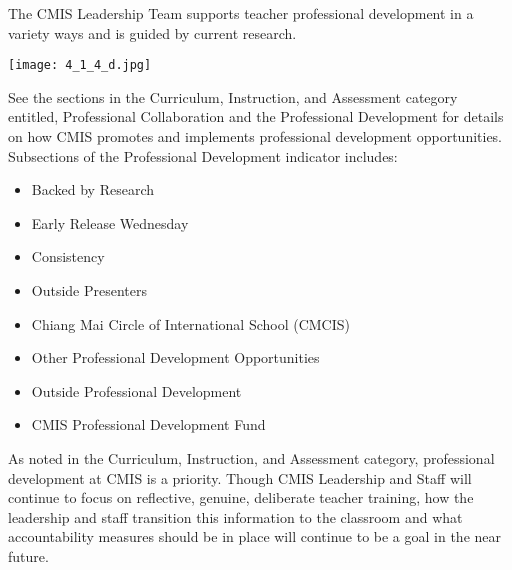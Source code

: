 \begin{findings}
The CMIS Leadership Team supports teacher professional development in a variety ways and is guided by current research. 

\texttt{[image: 4\_1\_4\_d.jpg]}

See the sections in the Curriculum, Instruction, and Assessment category entitled, Professional Collaboration and the Professional Development for details on how CMIS promotes and implements professional development opportunities. Subsections of the Professional Development indicator includes:

\begin{itemize}
\item Backed by Research
\item Early Release Wednesday
\item Consistency 
\item Outside Presenters
\item Chiang Mai Circle of International School (CMCIS) 
\item Other Professional Development Opportunities
\item Outside Professional Development 
\item CMIS Professional Development Fund 
\end{itemize}


As noted in the Curriculum, Instruction, and Assessment category, professional development at CMIS is a priority. Though CMIS Leadership and Staff will continue to focus on reflective, genuine, deliberate teacher training, how the leadership and staff transition this information to the classroom and what accountability measures should be in place will continue to be a goal in the near future.
\end{findings}




